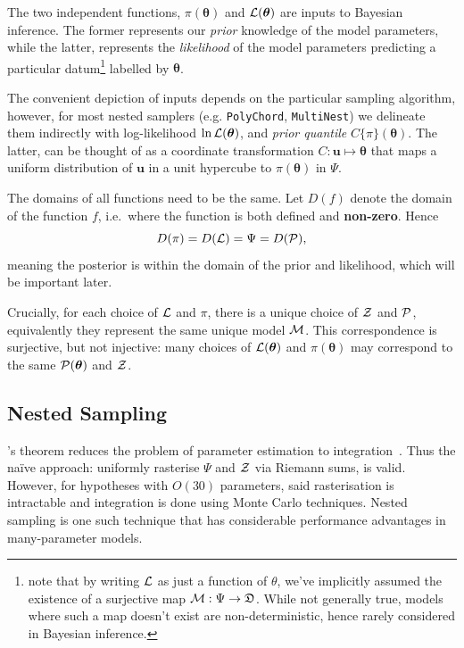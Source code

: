 \documentclass[usenatbib]{mnras}
\begin{document}
The two independent functions, \(\pi(\bm{\theta})\) and
\({\cal L}(\bm{\theta})\) are inputs to Bayesian inference. The former
represents our \emph{prior} knowledge of the model parameters, while
the latter, represents the \emph{likelihood} of the model parameters
predicting a particular datum\footnote{note that by writing ${\cal L}$
  as just a function of $\theta$, we've implicitly assumed the
  existence of a surjective map
  ${\cal M}: \Psi \rightarrow \mathfrak{D}$. While not generally true,
  models where such a map doesn't exist are non-deterministic, hence
  rarely considered in Bayesian inference. } labelled by
$\bm{\theta}$.

The convenient depiction of inputs depends on the particular sampling
algorithm, however, for most nested samplers (e.g. \texttt{PolyChord},
\texttt{MultiNest}) we delineate them indirectly with log-likelihood
\(\ln \cal L (\bm{\theta})\), and \emph{prior quantile}
\(C\{\pi\}(\bm{\theta})\). The latter, can be thought of as a
coordinate transformation $C: \bm{u} \mapsto \bm{\theta}$ that maps a
uniform distribution of $\bm{u}$ in a unit hypercube to
$\pi(\bm{\theta})$ in $\Psi$.

The domains of all functions need to be the same. Let
\(D(f)\) denote the domain of the function \(f\), i.e.~where the
function is both defined and \textbf{non-zero}. Hence
\begin{equation}
  D(\pi) = D({\cal L}) = \Psi = D({\cal P}),
\end{equation} 
meaning the posterior is within the domain of the prior and
likelihood, which will be important later.\label{domain-discussion}

Crucially, for each choice of ${\cal L}$ and $\pi$, there is a unique
choice of ${\cal Z}$ and ${\cal P}$, equivalently they represent the
same unique model ${\cal M}$. This correspondence is surjective, but
not injective: many choices of \({\cal L}(\bm{\theta})\) and
\(\pi (\bm{\theta})\) may correspond to the same
\( {\cal P} (\bm{\theta})\) and \({\cal Z}\).

\subsection{Nested Sampling}\label{sec:org36366f8}

\citeauthor{1763}'s theorem reduces the problem of parameter
estimation to integration~\citep{bayes-integration}. Thus the naïve
approach: uniformly rasterise \(\Psi\) and \({\cal Z}\) via Riemann
sums, is valid. However, for hypotheses with \(O(30)\) parameters,
said rasterisation is intractable \citep{Caflisch_1998} and
integration is done using Monte Carlo techniques. Nested sampling is
one such technique that has considerable performance advantages in
many-parameter models.
\end{document}

